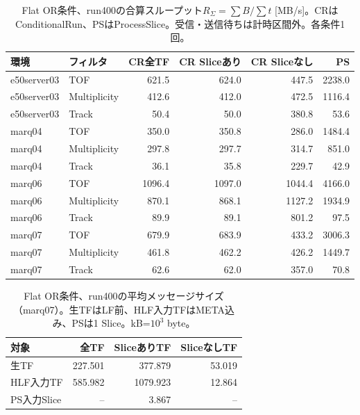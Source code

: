\begin{table}[htbp]
\centering\small
\caption{Flat OR条件、run400の合算スループット$R_\Sigma=\sum B/\sum t$ [MB/s]。CRはConditionalRun、PSはProcessSlice。受信・送信待ちは計時区間外。各条件1回。}
\begin{tabular}{llrrrr}\hline
環境 & フィルタ & CR全TF & CR Sliceあり & CR Sliceなし & PS \\\hline
e50server03 & TOF & 621.5 & 624.0 & 447.5 & 2238.0 \\
e50server03 & Multiplicity & 412.6 & 412.0 & 472.5 & 1116.4 \\
e50server03 & Track & 50.4 & 50.0 & 380.8 & 53.6 \\
marq04 & TOF & 350.0 & 350.8 & 286.0 & 1484.4 \\
marq04 & Multiplicity & 297.8 & 297.7 & 314.7 & 851.0 \\
marq04 & Track & 36.1 & 35.8 & 229.7 & 42.9 \\
marq06 & TOF & 1096.4 & 1097.0 & 1044.4 & 4166.0 \\
marq06 & Multiplicity & 870.1 & 868.1 & 1127.2 & 1934.9 \\
marq06 & Track & 89.9 & 89.1 & 801.2 & 97.5 \\
marq07 & TOF & 679.9 & 683.9 & 433.2 & 3006.3 \\
marq07 & Multiplicity & 461.8 & 462.2 & 426.2 & 1449.7 \\
marq07 & Track & 62.6 & 62.0 & 357.0 & 70.8 \\
\hline\end{tabular}\end{table}
\begin{table}[htbp]\centering\small
\caption{Flat OR条件、run400の平均メッセージサイズ（marq07）。生TFはLF前、HLF入力TFはMETA込み、PSは1 Slice。kB=$10^3$ byte。}
\begin{tabular}{lrrr}\hline
対象 & 全TF & SliceありTF & SliceなしTF \\\hline
生TF & 227.501 & 377.879 & 53.019 \\
HLF入力TF & 585.982 & 1079.923 & 12.864 \\
PS入力Slice & -- & 3.867 & -- \\
\hline\end{tabular}\end{table}
